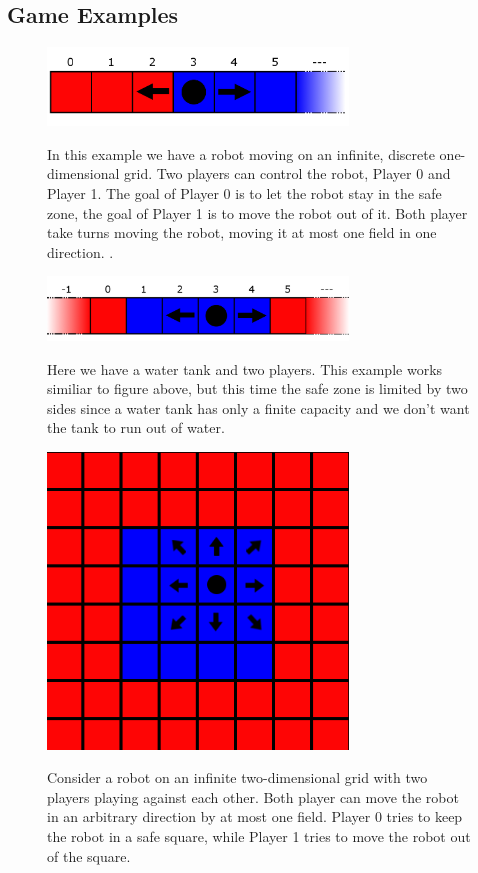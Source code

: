 \documentclass[10pt,a4paper]{article}
\theoremstyle{plain}
\theoremstyle{definition}
\begin{document}
\subsection{Game Examples}
\begin{figure}[h] \label{Laufband}
  \caption{In this example we have a robot moving on an infinite, discrete one-dimensional grid. Two players can control the robot, Player 0 and Player 1. The goal of Player 0 is to let the robot stay in the safe zone, the goal of Player 1 is to move the robot out of it. Both player take turns moving the robot, moving it at most one field in one direction.
.}
  \centering
    {\includegraphics[width=8.0cm]{laufband.png}} 

\end{figure}


\begin{figure}[h]\label{Wassertank}
  \caption{Here we have a water tank and two players. This example works similiar to figure above, but this time the safe zone is limited by two sides since a water tank has only a finite capacity and we don't want the tank to run out of water.
}
  \centering
    {\includegraphics[width=8.0cm]{wasser_tank.png}} 
\end{figure}

\begin{figure}
  \caption{Consider a robot on an infinite two-dimensional grid with two players playing against each other. Both player can move the robot in an arbitrary direction by at most one field. Player 0 tries to keep the robot in a safe square, while Player 1 tries to move the robot out of the square.
}
  \centering
    {\includegraphics[width=8.0cm]{quadrat.png}} 
\end{figure}
\end{document}
